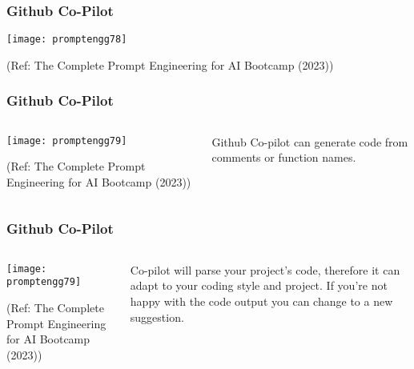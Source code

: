 \begin{frame}[fragile]\frametitle{Github Co-Pilot}

		\begin{center}
		\texttt{[image: promptengg78]}

		{\tiny (Ref: The Complete Prompt Engineering for AI Bootcamp (2023))}
		\end{center}	

\end{frame}

\begin{frame}[fragile]\frametitle{Github Co-Pilot}


\begin{columns}
    \begin{column}[T]{0.6\linewidth}
		\begin{center}
		\texttt{[image: promptengg79]}

		{\tiny (Ref: The Complete Prompt Engineering for AI Bootcamp (2023))}
		\end{center}	
    \end{column}
    \begin{column}[T]{0.4\linewidth}
		Github Co-pilot can generate code from comments or function names.
    \end{column}
  \end{columns}
\end{frame}

\begin{frame}[fragile]\frametitle{Github Co-Pilot}


\begin{columns}
    \begin{column}[T]{0.6\linewidth}
		\begin{center}
		\texttt{[image: promptengg79]}

		{\tiny (Ref: The Complete Prompt Engineering for AI Bootcamp (2023))}
		\end{center}	
    \end{column}
    \begin{column}[T]{0.4\linewidth}
		Co-pilot will parse your project’s code, therefore it can adapt to your coding style and project.
		If you’re not happy with the code output you can change to a new suggestion.
    \end{column}
  \end{columns}
\end{frame}

